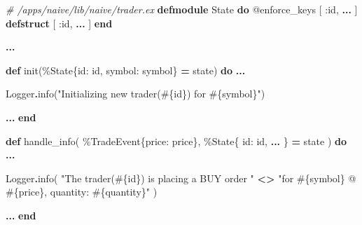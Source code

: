 \documentclass[
]{book}
\newenvironment{Shaded}{\begin{snugshade}}{\end{snugshade}}
\newcommand{\CommentTok}[1]{\textcolor[rgb]{0.56,0.35,0.01}{\textit{#1}}}
\newcommand{\ConstantTok}[1]{\textcolor[rgb]{0.00,0.00,0.00}{#1}}
\newcommand{\KeywordTok}[1]{\textcolor[rgb]{0.13,0.29,0.53}{\textbf{#1}}}
\newcommand{\NormalTok}[1]{#1}
\newcommand{\OperatorTok}[1]{\textcolor[rgb]{0.81,0.36,0.00}{\textbf{#1}}}
\newcommand{\OtherTok}[1]{\textcolor[rgb]{0.56,0.35,0.01}{#1}}
\newcommand{\StringTok}[1]{\textcolor[rgb]{0.31,0.60,0.02}{#1}}
\newcommand{\VariableTok}[1]{\textcolor[rgb]{0.00,0.00,0.00}{#1}}
\begin{document}
\begin{Shaded}
\begin{Highlighting}[]
  \CommentTok{\# /apps/naive/lib/naive/trader.ex}
  \KeywordTok{defmodule} \ConstantTok{State} \KeywordTok{do}
    \OtherTok{@enforce\_keys}\NormalTok{ [}
      \VariableTok{:id}\NormalTok{,}
      \OperatorTok{...}
\NormalTok{    ]}
    \KeywordTok{defstruct}\NormalTok{ [}
      \VariableTok{:id}\NormalTok{,}
      \OperatorTok{...}
\NormalTok{    ]}
  \KeywordTok{end}

  \OperatorTok{...}

  \KeywordTok{def}\NormalTok{ init(\%}\ConstantTok{State}\NormalTok{\{}\VariableTok{id:}\NormalTok{ id, }\VariableTok{symbol:}\NormalTok{ symbol\} }\OperatorTok{=}\NormalTok{ state) }\KeywordTok{do}
    \OperatorTok{...}

    \ConstantTok{Logger}\OperatorTok{.}\NormalTok{info(}\StringTok{"Initializing new trader(}\OtherTok{\#\{}\NormalTok{id}\OtherTok{\}}\StringTok{) for }\OtherTok{\#\{}\NormalTok{symbol}\OtherTok{\}}\StringTok{"}\NormalTok{)}

    \OperatorTok{...}
  \KeywordTok{end}

  \KeywordTok{def}\NormalTok{ handle\_info(}
\NormalTok{        \%}\ConstantTok{TradeEvent}\NormalTok{\{}\VariableTok{price:}\NormalTok{ price\},}
\NormalTok{        \%}\ConstantTok{State}\NormalTok{\{}
          \VariableTok{id:}\NormalTok{ id,}
          \OperatorTok{...}
\NormalTok{        \} }\OperatorTok{=}\NormalTok{ state}
\NormalTok{      ) }\KeywordTok{do}
    \OperatorTok{...}

    \ConstantTok{Logger}\OperatorTok{.}\NormalTok{info(}
      \StringTok{"The trader(}\OtherTok{\#\{}\NormalTok{id}\OtherTok{\}}\StringTok{) is placing a BUY order "} \OperatorTok{\textless{}\textgreater{}}
        \StringTok{"for }\OtherTok{\#\{}\NormalTok{symbol}\OtherTok{\}}\StringTok{ @ }\OtherTok{\#\{}\NormalTok{price}\OtherTok{\}}\StringTok{, quantity: }\OtherTok{\#\{}\NormalTok{quantity}\OtherTok{\}}\StringTok{"}
\NormalTok{    )}

    \OperatorTok{...}
  \KeywordTok{end}


\end{Highlighting}
\end{Shaded}
\end{document}

